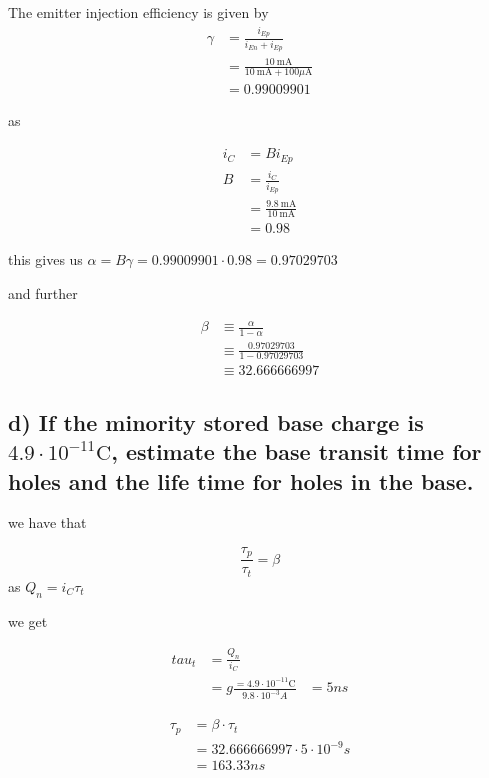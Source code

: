 The emitter injection efficiency is given by
$$\begin{aligned}
    \gamma &= \frac{i_{Ep}}{i_{En}+i_{Ep}}\\
    &=\frac{10 \mathrm{~mA}}{10 \mathrm{~mA}+100 \mu \mathrm{A}}\\
    &=0.99009901 
\end{aligned}$$

as 

$$
\begin{aligned}
    i_C&=Bi_{Ep}\\
    B&=\frac{i_C}{i_{Ep}}\\
    &=\frac{9.8 \mathrm{~mA}}{10 \mathrm{~mA}}\\
    &=0.98
\end{aligned}
$$

this gives us $\alpha=B\gamma=0.99009901 \cdot0.98=0.97029703$

and further

$$\begin{aligned}
    \beta&\equiv\frac{\alpha}{1-\alpha}\\
    &\equiv\frac{0.97029703}{1-0.97029703}\\
    &\equiv 32.666666997
\end{aligned}$$



\subsection*{d) If the minority stored base charge is $4.9 \cdot 10^{-11} \mathrm{C}$, estimate the base transit time for holes and the life time for holes in the base.}

we have that 

$$\frac{\tau_p}{\tau_t}=\beta$$
as $Q_n=i_C\tau_t$

we get

$$
\begin{aligned}
    tau_t&=\frac{Q_n}{i_C}\\
    &=g\frac{=4.9 \cdot 10^{-11} \mathrm{C}}{9.8\cdot 10^{-3}A}
    &=5ns
\end{aligned}$$

$$
\begin{aligned}
    \tau_p&=\beta \cdot\tau_t\\
    &=32.666666997\cdot5\cdot10^{-9}s\\
    &=163.33ns
\end{aligned}
$$